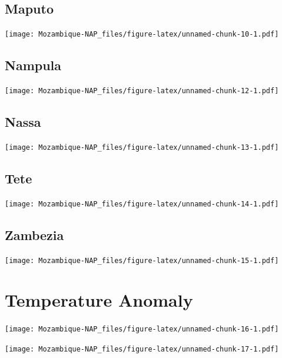 \documentclass[
]{book}
\begin{document}
\hypertarget{maputo}{%
\subsection{Maputo}\label{maputo}}

\texttt{[image: Mozambique-NAP\_files/figure-latex/unnamed-chunk-10-1.pdf]}

\hypertarget{section}{%
\subsection{}\label{section}}

\hypertarget{nampula}{%
\subsection{Nampula}\label{nampula}}

\texttt{[image: Mozambique-NAP\_files/figure-latex/unnamed-chunk-12-1.pdf]}

\hypertarget{nassa}{%
\subsection{Nassa}\label{nassa}}

\texttt{[image: Mozambique-NAP\_files/figure-latex/unnamed-chunk-13-1.pdf]}

\hypertarget{tete}{%
\subsection{Tete}\label{tete}}

\texttt{[image: Mozambique-NAP\_files/figure-latex/unnamed-chunk-14-1.pdf]}

\hypertarget{zambezia}{%
\subsection{Zambezia}\label{zambezia}}

\texttt{[image: Mozambique-NAP\_files/figure-latex/unnamed-chunk-15-1.pdf]}

\hypertarget{temperature-anomaly}{%
\section{Temperature Anomaly}\label{temperature-anomaly}}

\texttt{[image: Mozambique-NAP\_files/figure-latex/unnamed-chunk-16-1.pdf]}

\texttt{[image: Mozambique-NAP\_files/figure-latex/unnamed-chunk-17-1.pdf]}
\end{document}
